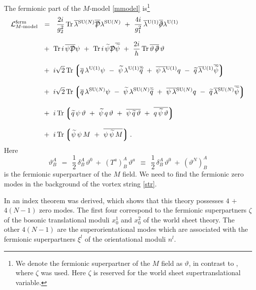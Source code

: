\documentclass[12pt]{article}
\def\Tr{{\rm Tr}}
\newcommand{\p}{\partial}
\newcommand{\wt}{\widetilde}
\newcommand{\ov}{\overline}
\newcommand{\mc}[1]{\mathcal{#1}}
\newcommand{\md}{\mathcal{D}}
\newcommand{\lgr}{\left\lgroup}
\newcommand{\rgr}{\right\rgroup}
\def\slashed#1{\setbox0=\hbox{$#1$}             %
   \dimen0=\wd0                                 %
   \setbox1=\hbox{/} \dimen1=\wd1               %
   \ifdim\dimen0>\dimen1                        %
      \rlap{\hbox to \dimen0{\hfil/\hfil}}      %
      #1                                        %
   \else                                        %
      \rlap{\hbox to \dimen1{\hfil$#1$\hfil}}   %
      /                                         %
   \fi}                                        %
\begin{document}
	The fermionic part of the $M$-model \eqref{mmodel} is\footnote{
We denote the fermionic superpartner of the $M$ field as $\vartheta$, in contrast to \cite{GSYmmodel},
where $\zeta$ was used. Here $\zeta$ is reserved for the world sheet supertranslational variable.}
\begin{align}
%
\notag
	\mc{L}_\text{$M$-model}^\text{ferm} & ~~=~~ 
		\frac{2i}{g_2^2}\, \Tr\, \ov{\lambda}{}^\text{SU($N$)} \ov{\slashed{\md}} \lambda^{\text{SU($N$)}}
		~+~ \frac{4i}{g_1^2}\, \ov{\lambda}{}^\text{U(1)} \ov{\slashed{\p}} \lambda^\text{U(1)}
	\\[3mm]
%
\notag
	&~
 		~+~ \Tr\, i\, \ov{\psi \slashed{\md}} \psi  
		~+~ \Tr\, i\, \wt{\psi} \slashed{\md} \ov{\wt{\psi}}
		~+~ \frac{2i}{h}\, \Tr\, \ov{\vartheta\,\slashed{\p}}\,\vartheta
	\\[3mm]
%
\label{fermact}
	&~
		~+~
		i \sqrt{2}\, \Tr 
		\lgr \ov{q}\,\lambda^\text{U(1)}\psi ~-~ \wt{\psi}\,\lambda^\text{U(1)}\ov{\wt{q}}
		 ~+~ \ov{\psi\, \lambda}{}^\text{U(1)} q ~-~ \wt{q}\,\ov{\lambda}{}^\text{U(1)}\ov{\wt{\psi}} \rgr
	\\[3mm]
%
\notag
	&~
		~+~
		i \sqrt{2}\, \Tr
		\lgr \ov{q}\,\lambda^\text{SU($N$)}\psi ~-~ \wt{\psi}\,\lambda^\text{SU($N$)}\ov{\wt{q}}
		 ~+~ \ov{\psi\, \lambda}{}^\text{SU($N$)}q ~-~ \wt{q}\,\ov{\lambda}{}^\text{SU($N$)}\ov{\wt{\psi}} \rgr
	\\[3mm]
%
\notag
	&~
		~+~
		i\,\Tr \lgr
			    \wt{q}\, \psi\,\vartheta ~+~ \wt{\psi}\,q\,\vartheta 
			~+~ \ov{\psi\, \wt{q}\,\vartheta}  ~+~ \ov{q\,\wt{\psi}\,\vartheta} \rgr
	\\[3mm]
%
\notag
	&~
		~+~
		i\,\Tr \lgr
				\wt{\psi}\,\psi\,M ~+~ \ov{\psi\, \wt{\psi}\, M} \rgr .
\end{align}
	Here 
\[
	\vartheta^A_B ~~=~~ \frac{1}{2}\,\delta^A_B\, \vartheta^0  ~+~
				(T^a)^A_B\, \vartheta^{a}  ~~\equiv~~
			\frac{1}{2}\,\delta^A_B\, \vartheta^0  ~+~
				(\vartheta^N)^A_B
\]
	is the fermionic superpartner of the $M$ field.
	We need to find the fermionic zero modes in the background of the vortex string \eqref{str}.

	In \cite{GSYmmodel} an index theorem was derived, which shows that this theory possesses
	$ 4 $ $ + $ $ 4 ( N - 1 ) $ zero modes.
	The first four correspond to the fermionic superpartners $ \zeta $ of the bosonic translational moduli
	$ x_0^1 $ and $ x_0^2 $ of the world sheet theory. 
	The other $ 4 ( N - 1 ) $ are the superorientational modes which are associated with the 
	fermionic superpartners $ \xi^l $ of the orientational moduli $ n^l $.
\end{document}

